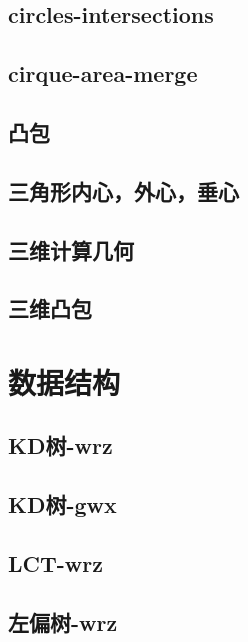 \documentclass[titlepage,a4paper,10pt]{article}
\begin{document}
\begin{multicols}{2}
\begin{spacing}{0.8}
			\subsection{circles-intersections}
				
			\subsection{cirque-area-merge}
				
			\subsection{凸包}
				
			\subsection{三角形内心，外心，垂心}
				
			\subsection{三维计算几何}
				
			\subsection{三维凸包}
				
		\section{数据结构}
			\subsection{KD树-wrz}
				
			\subsection{KD树-gwx}
				
			\subsection{LCT-wrz}
				
			\subsection{左偏树-wrz}
				

\end{spacing}
\end{multicols}
\end{document}

